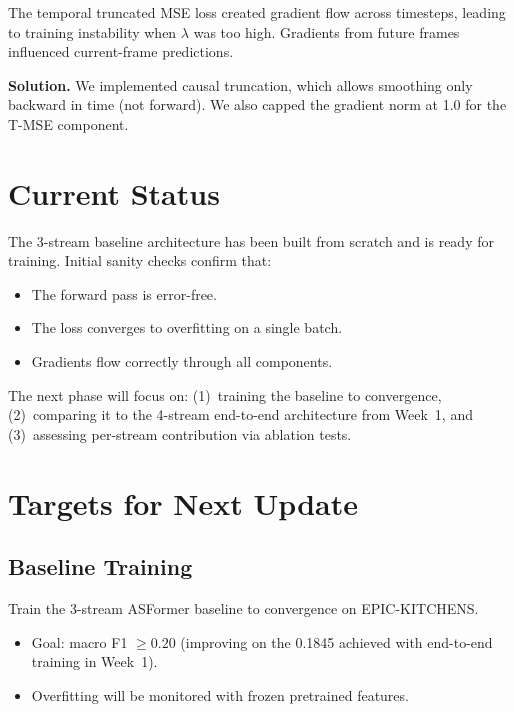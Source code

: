 \documentclass[11pt,a4paper]{article}
\begin{document}
The temporal truncated MSE loss created gradient flow across timesteps, leading to training instability when $\lambda$ was too high. Gradients from future frames influenced current-frame predictions.

\textbf{Solution.} We implemented causal truncation, which allows smoothing only backward in time (not forward). We also capped the gradient norm at 1.0 for the T-MSE component.

\section{Current Status}

The 3-stream baseline architecture has been built from scratch and is ready for training. Initial sanity checks confirm that:

\begin{itemize}[nosep]
  \item The forward pass is error-free.
  \item The loss converges to overfitting on a single batch.
  \item Gradients flow correctly through all components.
\end{itemize}

\noindent The next phase will focus on: (1)~training the baseline to convergence, (2)~comparing it to the 4-stream end-to-end architecture from Week~1, and (3)~assessing per-stream contribution via ablation tests.

\section{Targets for Next Update}

\subsection{Baseline Training}

Train the 3-stream ASFormer baseline to convergence on EPIC-KITCHENS.
\begin{itemize}[nosep]
  \item Goal: macro F1 $\geq 0.20$ (improving on the 0.1845 achieved with end-to-end training in Week~1).
  \item Overfitting will be monitored with frozen pretrained features.
\end{itemize}
\end{document}
